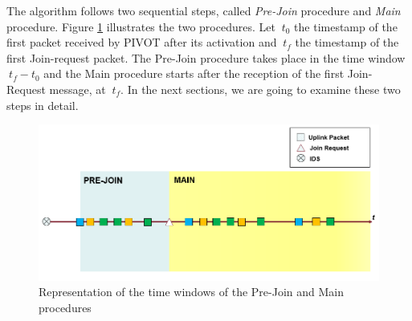 The algorithm follows two sequential steps, called \textit{Pre-Join} procedure and \textit{Main} procedure. Figure \ref{fig:pre_main} illustrates the two procedures. Let \(\ t_{0} \) the timestamp of the first packet received by PIVOT after its activation and \(\ t_{f} \) the timestamp of the first Join-request packet. The Pre-Join procedure takes place in the time window \(\ t_{f} - t_{0} \) and the Main procedure starts after the reception of the first Join-Request message, at \(\ t_{f} \). In the next sections, we are going to examine these two steps in detail.

\begin{figure}[H]
    \centering
    \vspace{4mm}
    \includegraphics[width=0.7\linewidth]{images/pivot/pre-main.PNG}
    \caption{Representation of the time windows of the Pre-Join and Main procedures}
    \label{fig:pre_main}
\end{figure}
\vspace{5mm}




